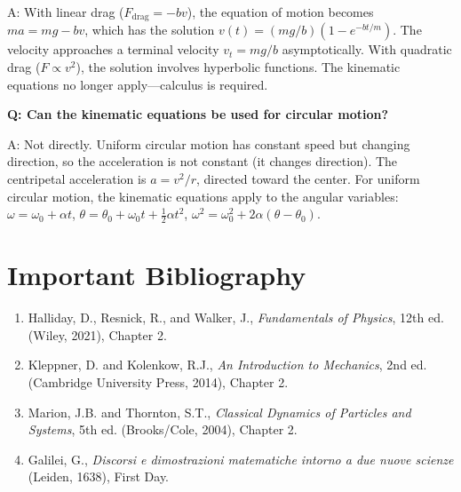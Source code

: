 A: With linear drag ($F_{\text{drag}} = -bv$), the equation of motion becomes $ma = mg - bv$, which has the solution $v(t) = (mg/b)(1 - e^{-bt/m})$. The velocity approaches a terminal velocity $v_t = mg/b$ asymptotically. With quadratic drag ($F \propto v^2$), the solution involves hyperbolic functions. The kinematic equations no longer apply---calculus is required.

\textbf{Q: Can the kinematic equations be used for circular motion?}

A: Not directly. Uniform circular motion has constant speed but changing direction, so the acceleration is not constant (it changes direction). The centripetal acceleration is $a = v^2/r$, directed toward the center. For uniform circular motion, the kinematic equations apply to the angular variables: $\omega = \omega_0 + \alpha t$, $\theta = \theta_0 + \omega_0 t + \frac{1}{2}\alpha t^2$, $\omega^2 = \omega_0^2 + 2\alpha(\theta - \theta_0)$.
\section*{Important Bibliography}

\begin{enumerate}
\item Halliday, D., Resnick, R., and Walker, J., \textit{Fundamentals of Physics}, 12th ed. (Wiley, 2021), Chapter 2.
\item Kleppner, D. and Kolenkow, R.J., \textit{An Introduction to Mechanics}, 2nd ed. (Cambridge University Press, 2014), Chapter 2.
\item Marion, J.B. and Thornton, S.T., \textit{Classical Dynamics of Particles and Systems}, 5th ed. (Brooks/Cole, 2004), Chapter 2.
\item Galilei, G., \textit{Discorsi e dimostrazioni matematiche intorno a due nuove scienze} (Leiden, 1638), First Day.
\end{enumerate}

